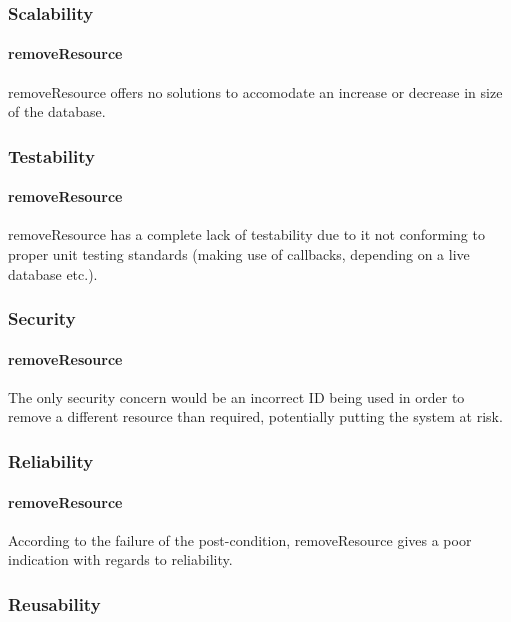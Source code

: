 \documentclass[a4paper]{article}
\begin{document}
\subsubsection {Scalability}

\paragraph{removeResource}
removeResource offers no solutions to accomodate an increase or decrease in size of the database.

\subsubsection {Testability}

\paragraph{removeResource}
removeResource has a complete lack of testability due to it not conforming to proper unit testing standards (making use of callbacks, depending on a live database etc.).

\subsubsection {Security}

\paragraph{removeResource}
The only security concern would be an incorrect ID being used in order to remove a different resource than required, potentially putting the system at risk.

\subsubsection {Reliability}

\paragraph{removeResource}
According to the failure of the post-condition, removeResource gives a poor indication with regards to reliability.

\subsubsection {Reusability}
\end{document}
